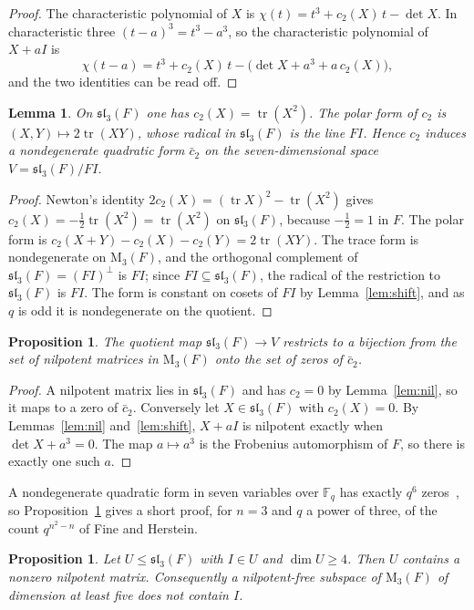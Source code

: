 \documentclass[11pt]{amsart}
\newtheorem{proposition}[theorem]{Proposition}
\newtheorem{lemma}[theorem]{Lemma}
\theoremstyle{definition}
\theoremstyle{remark}
\numberwithin{equation}{section}
\newcommand{\F}{\mathbb{F}}
\newcommand{\M}{\mathrm{M}}
\newcommand{\sll}{\mathfrak{sl}}
\newcommand{\tr}{\operatorname{tr}}
\begin{document}
\begin{proof}
The characteristic polynomial of $X$ is $\chi(t)=t^3+c_2(X)\,t-\det X$. In characteristic three $(t-a)^3=t^3-a^3$, so the characteristic polynomial of $X+aI$ is
\[
\chi(t-a)=t^3+c_2(X)\,t-\bigl(\det X+a^3+a\,c_2(X)\bigr),
\]
and the two identities can be read off.
\end{proof}

\begin{lemma}\label{lem:quadric}
On $\sll_3(F)$ one has $c_2(X)=\tr(X^2)$. The polar form of $c_2$ is $(X,Y)\mapsto 2\tr(XY)$, whose radical in $\sll_3(F)$ is the line $FI$. Hence $c_2$ induces a nondegenerate quadratic form $\bar c_2$ on the seven-dimensional space $V=\sll_3(F)/FI$.
\end{lemma}

\begin{proof}
Newton's identity $2c_2(X)=(\tr X)^2-\tr(X^2)$ gives $c_2(X)=-\tfrac12\tr(X^2)=\tr(X^2)$ on $\sll_3(F)$, because $-\tfrac12=1$ in $F$. The polar form is $c_2(X+Y)-c_2(X)-c_2(Y)=2\tr(XY)$. The trace form is nondegenerate on $\M_3(F)$, and the orthogonal complement of $\sll_3(F)=(FI)^\perp$ is $FI$; since $FI\subseteq\sll_3(F)$, the radical of the restriction to $\sll_3(F)$ is $FI$. The form is constant on cosets of $FI$ by Lemma~\ref{lem:shift}, and as $q$ is odd it is nondegenerate on the quotient.
\end{proof}

\begin{proposition}\label{prop:cone}
The quotient map $\sll_3(F)\to V$ restricts to a bijection from the set of nilpotent matrices in $\M_3(F)$ onto the set of zeros of $\bar c_2$.
\end{proposition}

\begin{proof}
A nilpotent matrix lies in $\sll_3(F)$ and has $c_2=0$ by Lemma~\ref{lem:nil}, so it maps to a zero of $\bar c_2$. Conversely let $X\in\sll_3(F)$ with $c_2(X)=0$. By Lemmas~\ref{lem:nil} and~\ref{lem:shift}, $X+aI$ is nilpotent exactly when $\det X+a^3=0$. The map $a\mapsto a^3$ is the Frobenius automorphism of $F$, so there is exactly one such $a$.
\end{proof}

A nondegenerate quadratic form in seven variables over $\F_q$ has exactly $q^6$ zeros~\cite[Chapter~6]{LN}, so Proposition~\ref{prop:cone} gives a short proof, for $n=3$ and $q$ a power of three, of the count $q^{n^2-n}$ of Fine and Herstein.

\begin{proposition}\label{prop:identity}
Let $U\le\sll_3(F)$ with $I\in U$ and $\dim U\ge4$. Then $U$ contains a nonzero nilpotent matrix. Consequently a nilpotent-free subspace of $\M_3(F)$ of dimension at least five does not contain $I$.
\end{proposition}
\end{document}
